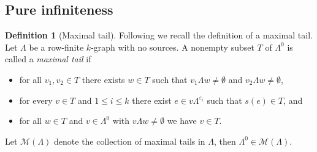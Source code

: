 \documentclass[12pt]{amsart}
\theoremstyle{plain}
\theoremstyle{definition}
\newtheorem{definition}[theorem]{Definition}
\theoremstyle{remark}
\begin{document}
\subsection{Pure infiniteness}

\begin{definition}[Maximal tail]
Following \cite{KaP} we recall the definition of a maximal tail. Let $\Lambda$ be a
row-finite $k$-graph with no sources. A nonempty subset $T$ of $\Lambda^0$ is called a
\emph{maximal tail} if
\begin{itemize}
\item[(MT1)] for all $v_1,v_2\in T$ there exists $w\in T$ such that $v_1 \Lambda w \neq \emptyset$ and $v_2\Lambda w\neq \emptyset$,
\item[(MT2)] for every $v\in T$ and $1\leq i\leq k$ there exist $e \in v \Lambda^{\varepsilon_i}$ such that $s(e) \in T$, and
\item[(MT3)] for all $w\in T$ and $v \in \Lambda^0$ with $v \Lambda w \neq \emptyset$ we  have $v\in T$.
\end{itemize}
\end{definition}

\noindent
Let $\mathcal{M} ( \Lambda )$ denote the collection of maximal tails in $\Lambda$, then $\Lambda^0 \in \mathcal{M} ( \Lambda )$.
\end{document}
